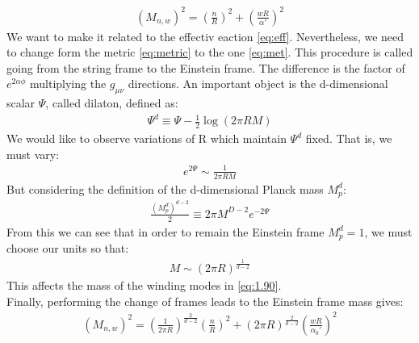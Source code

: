 \begin{align}
    \label{eq:1.90}
    (M_{n,w})^{2} = (\frac{n}{R})^{2} + (\frac{wR}{\alpha'})^{2}
\end{align}
We want to make it related to the effectiv eaction \ref{eq:eff}. Nevertheless, we need to change form the metric \ref{eq:metric} to the one \ref{eq:met}. This procedure is called going from the string frame to the Einstein frame. The difference is the factor of $e^{2\alpha\phi}$ multiplying the $g_{\mu\nu}$ directions. An important object is the d-dimensional scalar $\Psi$, called dilaton, defined as:
\begin{align}
    \Psi^{d} \equiv \Psi - \frac{1}{2} \log (2\pi R M)
\end{align}
We would like to observe variations of R which maintain $\Psi ^{d}$ fixed. That is, we must vary:
\begin{align}
    e^{2\Psi} \sim \frac{1}{2\pi R M}
\end{align}
But considering the definition of the d-dimensional Planck mass $M_{p}^{d}$:
\begin{align}
    \frac{(M_{p}^{d})^{d-2}}{2} \equiv 2\pi M^{D-2} e^{-2\Psi}
\end{align}
From this we can see that in order to remain the Einstein frame $M_{p} ^{d} = 1$, we must choose our units so that:
\begin{align}
    M \sim (2\pi R) ^{\frac{1}{d-2}}
\end{align}
This affects the mass of the winding modes in \ref{eq:1.90}. \\
\indent Finally, performing the change of frames leads to the Einstein frame mass gives:
\begin{align}
    \label{eq:efram}
    (M_{n,w})^{2} = (\frac{1}{2\pi R})^{\frac{2}{d-2}} (\frac{n}{R})^{2} + (2\pi R)^{\frac{2}{d-2}} (\frac{wR}{\alpha_{0}'})^{2}
\end{align}


